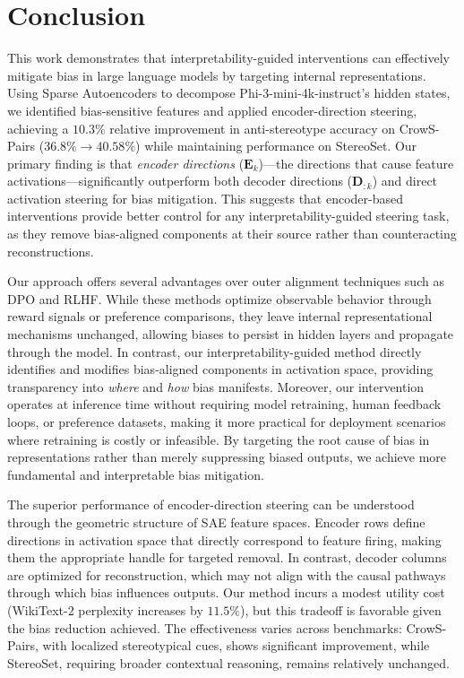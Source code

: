 \section{Conclusion}

This work demonstrates that interpretability-guided interventions can effectively mitigate bias in large language models by targeting internal representations. Using Sparse Autoencoders to decompose Phi-3-mini-4k-instruct's hidden states, we identified bias-sensitive features and applied encoder-direction steering, achieving a $10.3\%$ relative improvement in anti-stereotype accuracy on CrowS-Pairs ($36.8\% \to 40.58\%$) while maintaining performance on StereoSet. Our primary finding is that \emph{encoder directions} ($\mathbf{E}_k$)—the directions that cause feature activations—significantly outperform both decoder directions ($\mathbf{D}_{:k}$) and direct activation steering for bias mitigation. This suggests that encoder-based interventions provide better control for any interpretability-guided steering task, as they remove bias-aligned components at their source rather than counteracting reconstructions.

Our approach offers several advantages over outer alignment techniques such as DPO and RLHF. While these methods optimize observable behavior through reward signals or preference comparisons, they leave internal representational mechanisms unchanged, allowing biases to persist in hidden layers and propagate through the model. In contrast, our interpretability-guided method directly identifies and modifies bias-aligned components in activation space, providing transparency into \emph{where} and \emph{how} bias manifests. Moreover, our intervention operates at inference time without requiring model retraining, human feedback loops, or preference datasets, making it more practical for deployment scenarios where retraining is costly or infeasible. By targeting the root cause of bias in representations rather than merely suppressing biased outputs, we achieve more fundamental and interpretable bias mitigation.

The superior performance of encoder-direction steering can be understood through the geometric structure of SAE feature spaces. Encoder rows define directions in activation space that directly correspond to feature firing, making them the appropriate handle for targeted removal. In contrast, decoder columns are optimized for reconstruction, which may not align with the causal pathways through which bias influences outputs. Our method incurs a modest utility cost (WikiText-2 perplexity increases by $11.5\%$), but this tradeoff is favorable given the bias reduction achieved. The effectiveness varies across benchmarks: CrowS-Pairs, with localized stereotypical cues, shows significant improvement, while StereoSet, requiring broader contextual reasoning, remains relatively unchanged.

